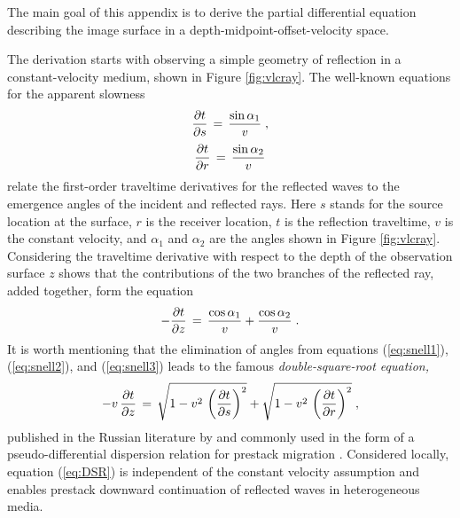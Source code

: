 


The main goal of this appendix is to derive the partial differential
equation describing the image surface in a
depth-midpoint-offset-velocity space.



The derivation starts with observing a simple geometry of reflection
in a constant-velocity medium, shown in Figure \ref{fig:vlcray}. The
well-known equations for the apparent slowness
\begin{equation}
{{\partial t} \over {\partial s}} \,=\,
{ {\sin{\alpha_1}} \over {v}}\;,
\label{eq:snell1}
\end{equation}
\begin{equation}
{{\partial t} \over {\partial r}} \,=\, 
{{\sin{\alpha_2}} \over {v}}  
\label{eq:snell2}
\end{equation} 
relate the first-order traveltime derivatives for the reflected waves
to the emergence angles of the incident and reflected rays. Here $s$
stands for the source location at the surface, $r$ is the receiver
location, $t$ is the reflection traveltime, $v$ is the constant
velocity, and $\alpha_1$ and $\alpha_2$ are the angles shown in Figure
\ref{fig:vlcray}. Considering the traveltime derivative with respect to
the depth of the observation surface $z$ shows that the
contributions of the two branches of the reflected ray, added
together, form the equation
\begin{equation}
- {{\partial t} \over {\partial z}} \,=\,
{{\cos{\alpha_1}} \over {v}} +
{{\cos{\alpha_2}} \over {v}}\;.
\label{eq:snell3}
\end{equation}
It is worth mentioning that the elimination of angles from equations
(\ref{eq:snell1}), (\ref{eq:snell2}), and (\ref{eq:snell3}) leads to
the famous {\em double-square-root equation,}
\begin{equation}
- v\,{{\partial t} \over {\partial z}} \,=\,
\sqrt{1 -  v^2\,\left({{\partial t} \over {\partial s}}\right)^2} +
\sqrt{1 -  v^2\,\left({{\partial t} \over {\partial r}}\right)^2}\;,
\label{eq:DSR}
\end{equation}
published in the Russian literature by \cite{alekseev} and commonly
used in the form of a pseudo-differential dispersion relation
\cite[]{Clayton.sep.14.21,Claerbout.blackwell.85} for prestack
migration \cite[]{Yilmaz.sepphd.18,Popovici.sep.84.53}. Considered
locally, equation (\ref{eq:DSR}) is independent of the constant velocity
assumption and enables  prestack downward
continuation of reflected waves in heterogeneous 
media.

